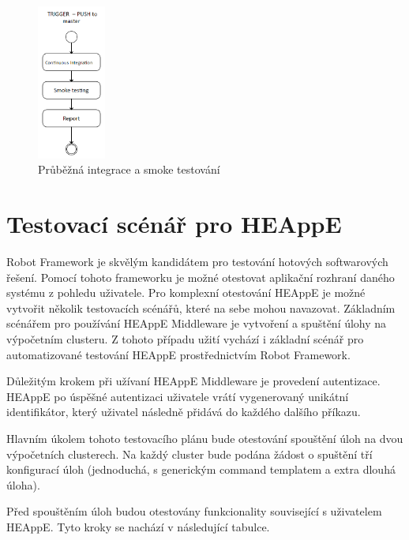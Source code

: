 \begin{figure}[h]
	\centering
	\includegraphics[width=0.2\textwidth]{Figures/cont-integration-diagram.png}
	\caption{Průběžná integrace a smoke testování}
	\label{fig:WritingThesis}
\end{figure}

\section{Testovací scénář pro HEAppE}
Robot Framework je skvělým kandidátem pro testování hotových softwarových řešení. Pomocí tohoto frameworku je možné otestovat aplikační rozhraní daného systému z pohledu uživatele. Pro komplexní otestování HEAppE je možné vytvořit několik testovacích scénářů, které na sebe mohou navazovat. Základním scénářem pro používání HEAppE Middleware je vytvoření a spuštění úlohy na výpočetním clusteru. Z tohoto případu užití vychází i základní scénář pro automatizované testování HEAppE prostřednictvím Robot Framework.

Důležitým krokem při užívaní HEAppE Middleware je provedení autentizace. HEAppE po úspěšné autentizaci uživatele vrátí vygenerovaný unikátní identifikátor, který uživatel následně přidává do každého dalšího příkazu.

Hlavním úkolem tohoto testovacího plánu bude otestování spouštění úloh na dvou výpočetních clusterech. Na každý cluster bude podána žádost o spuštění tří konfigurací úloh (jednoduchá, s generickým command templatem a extra dlouhá úloha).

Před spouštěním úloh budou otestovány funkcionality související s uživatelem HEAppE. Tyto kroky se nachází v následující tabulce.

\newcommand{\specialcell}[2][c]{%
  \begin{tabular}[#1]{@{}c@{}}#2\end{tabular}}

